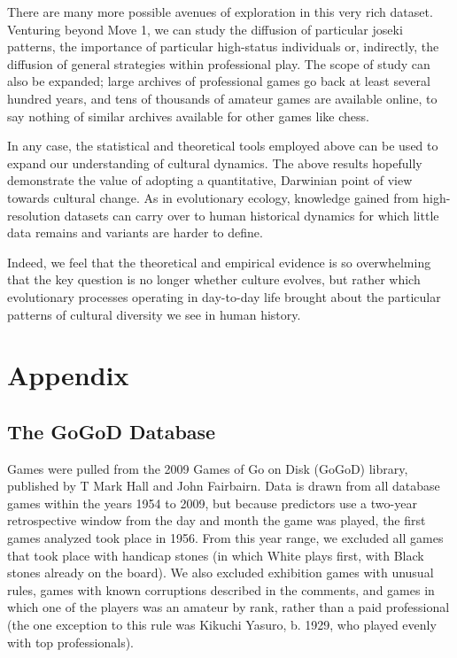 \documentclass[reqno,12pt]{amsart}
\begin{document}
There are many more possible avenues of exploration in this very rich dataset. Venturing beyond Move 1, we can study the diffusion of particular joseki patterns, the importance of particular high-status individuals or, indirectly, the diffusion of general strategies within professional play. The scope of study can also be expanded; large archives of professional games go back at least several hundred years, and tens of thousands of amateur games are available online, to say nothing of similar archives available for other games like chess.

In any case, the statistical and theoretical tools employed above can be used to expand our understanding of cultural dynamics. The above results hopefully demonstrate the value of adopting a quantitative, Darwinian point of view towards cultural change. As in evolutionary ecology, knowledge gained from high-resolution datasets can carry over to human historical dynamics for which little data remains and variants are harder to define.

Indeed, we feel that the theoretical and empirical evidence is so overwhelming that the key question is no longer whether culture evolves, but rather which evolutionary processes operating in day-to-day life brought about the particular patterns of cultural diversity we see in human history.




\newpage

\section{Appendix}

\subsection{The GoGoD Database}

Games were pulled from the 2009 Games of Go on Disk (GoGoD) library, published by T Mark Hall and John Fairbairn. Data is drawn from all database games within the years 1954 to 2009, but because predictors use a two-year retrospective window from the day and month the game was played, the first games analyzed took place in 1956. From this year range, we excluded all games that took place with handicap stones (in which White plays first, with Black stones already on the board). We also excluded exhibition games with unusual rules, games with known corruptions described in the comments, and games in which one of the players was an amateur by rank, rather than a paid professional (the one exception to this rule was Kikuchi Yasuro, b. 1929, who played evenly with top professionals).
\end{document}
